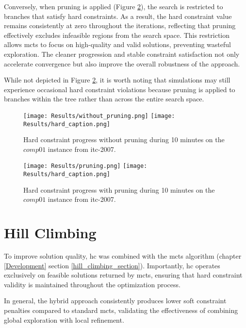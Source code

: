 Conversely, when pruning is applied (Figure \ref{fig:pruning_result}), the search is restricted to branches that satisfy hard constraints. As a result, the hard constraint value remains consistently at zero throughout the iterations, reflecting that pruning effectively excludes infeasible regions from the search space. This restriction allows \ac{mcts} to focus on high-quality and valid solutions, preventing wasteful exploration. The cleaner progression and stable constraint satisfaction not only accelerate convergence but also improve the overall robustness of the approach. 

While not depicted in Figure \ref{fig:pruning_result}, it is worth noting that simulations may still experience occasional hard constraint violations because pruning is applied to branches within the tree rather than across the entire search space.

\begin{figure}
 \centering
     \texttt{[image: Results/without\_pruning.png]}
     \texttt{[image: Results/hard\_caption.png]}
     \caption{Hard constraint progress without pruning during 10 minutes on the \(comp01\) instance from \ac{itc-2007}.}
     \label{fig:without_pruning_result}
\end{figure}

\begin{figure}
 \centering
    \texttt{[image: Results/pruning.png]}
    \texttt{[image: Results/hard\_caption.png]}
    \caption{Hard constraint progress with pruning during 10 minutes on the \(comp01\) instance from \ac{itc-2007}.}
    \label{fig:pruning_result}
\end{figure}

\section{Hill Climbing}

To improve solution quality, \ac{hc} was combined with the \ac{mcts} algorithm (chapter \ref{Development} section \ref{hill_climbing_section}). Importantly, \ac{hc} operates exclusively on feasible solutions returned by \ac{mcts}, ensuring that hard constraint validity is maintained throughout the optimization process.

In general, the hybrid approach consistently produces lower soft constraint penalties compared to standard \ac{mcts}, validating the effectiveness of combining global exploration with local refinement. 

